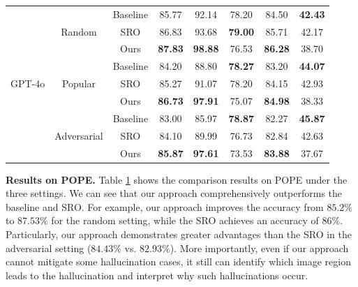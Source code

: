 \documentclass[10pt,twocolumn,letterpaper]{article}
\begin{document}
\begin{table}[htbp]
\begin{center}
{\begin{tabular}{c c c c c c | c | c}
\multirow{9}{*}{GPT-4o} & \multirow{3}{*}{Random}      & Baseline  &    85.77      &   92.14        &   78.20     &   84.50       &    \textbf{42.43}     \\      
                        &                             & SRO   &    86.83      &       93.68    &    \textbf{79.00}    &  85.71        &   42.17      \\ 
                        &                             & Ours   &  \textbf{87.83}        &    \textbf{98.88}       &    76.53    &    \textbf{86.28}      &    38.70     \\ \cmidrule{2-8}
                        & \multirow{3}{*}{Popular}     &    Baseline            &  84.20        &       88.80    &  \textbf{78.27}      &   83.20       &   \textbf{44.07}      \\
                        &                              &     SRO           &  85.27        &   91.07        &    78.20    &     84.15    &   42.93      \\
                        &                              &     Ours           &    \textbf{86.73}      &  \textbf{97.91}         &    75.07    &   \textbf{84.98}       &  38.33       \\ \cmidrule{2-8}
                        & \multirow{3}{*}{Adversarial} &     Baseline           &    83.00      &       85.97    &     \textbf{78.87}   &       82.27   &    \textbf{45.87}     \\
                        &                              &     SRO            &     84.10     &   89.99        &  76.73      &  82.84        &   42.63      \\
                        &                              &     Ours           &   \textbf{85.87}       &    \textbf{97.61}       &   73.53     &  \textbf{83.88}        &    37.67     \\ 
\bottomrule[1.5pt]%
\end{tabular}}
\label{tab:t1} %
\end{center}
\vspace{-1.0em}
\end{table}


\noindent\textbf{Results on POPE.} 
Table \ref{tab:t1} shows the comparison results on POPE under the three settings. We can see that our approach comprehensively outperforms the baseline and SRO. For example, our approach improves the accuracy from $85.2\%$ to $87.53\%$ for the random setting, while the SRO achieves an accuracy of $86\%$. Particularly, our approach demonstrates greater advantages than the SRO in the adversarial setting ($84.43\%$ vs. $82.93\%$). 
More importantly, even if our approach cannot mitigate some hallucination cases, it still can identify which image region leads to the hallucination and interpret why such hallucinations occur. %
\end{document}
